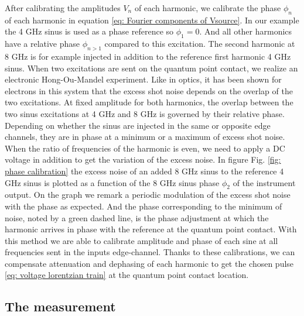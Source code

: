 After calibrating the amplitudes $V_{n}$ of each harmonic, we calibrate the phase $\phi_{n}$ of each harmonic in equation \eqref{eq: Fourier components of Vsource}.
In our example the 4 GHz sinus is used as a phase reference so $\phi_{1} = 0$.
And all other harmonics have a relative phase $\phi_{n>1}$ compared to this excitation.
The second harmonic at 8 GHz is for example injected in addition to the reference first harmonic 4 GHz sinus.
When two excitations are sent on the quantum point contact, we realize an electronic Hong-Ou-Mandel experiment.
Like in optics, it has been shown for electrons in this system \cite{hong1987measurement,bocquillon2013} that the excess shot noise depends on the overlap of the two excitations.
At fixed amplitude for both harmonics, the overlap between the two sinus excitations at 4 GHz and 8 GHz is governed by their relative phase.
Depending on whether the sinus are injected in the same or opposite edge channels, they are in phase at a minimum or a maximum of excess shot noise.
When the ratio of frequencies of the harmonic is even, we need to apply a DC voltage in addition to get the variation of the excess noise.
In figure Fig. \ref{fig: phase calibration} the excess noise of an added 8 GHz sinus to the reference 4 GHz sinus is plotted as a function of the 8 GHz sinus phase $\phi_{2}$ of the instrument output.
On the graph we remark a periodic modulation of the excess shot noise with the phase as expected.
And the phase corresponding to the minimum of noise, noted by a green dashed line, is the phase adjustment at which the harmonic arrives in phase with the reference at the quantum point contact.
With this method we are able to calibrate amplitude and phase of each sine at all frequencies sent in the inputs edge-channel.
Thanks to these calibrations, we can compensate attenuation and dephasing of each harmonic to get the chosen pulse \eqref{eq: voltage lorentzian train} at the quantum point contact location.

\subsection{The measurement}

